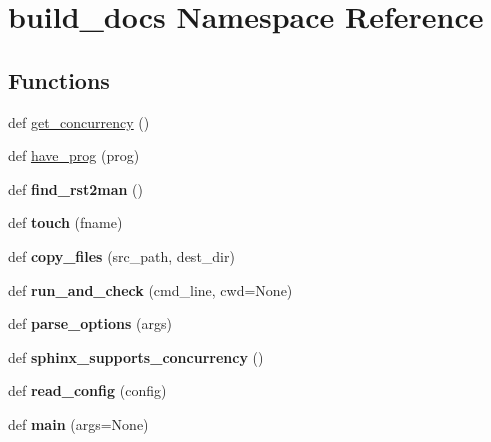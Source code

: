 \hypertarget{namespacebuild__docs}{}\section{build\+\_\+docs Namespace Reference}
\label{namespacebuild__docs}
\subsection*{Functions}
\begin{DoxyCompactItemize}
\item 
def \mbox{\hyperlink{namespacebuild__docs_adc33ba22722439845484b6f22b983e27}{get\+\_\+concurrency}} ()
\item 
def \mbox{\hyperlink{namespacebuild__docs_a9f47a32b0a2d2f838741524fd454bd83}{have\+\_\+prog}} (prog)
\item 
\mbox{\label{namespacebuild__docs_aa25e59983539da294d9d207bcf09652a}} 
def {\bfseries find\+\_\+rst2man} ()
\item 
\mbox{\label{namespacebuild__docs_a514e236726489944f91217af6b9dc1d5}} 
def {\bfseries touch} (fname)
\item 
\mbox{\label{namespacebuild__docs_ae414bc55d2fb97fbeeb17e1b8916164b}} 
def {\bfseries copy\+\_\+files} (src\+\_\+path, dest\+\_\+dir)
\item 
\mbox{\label{namespacebuild__docs_ade5dae7d70d4666c8a26b16e80ec5241}} 
def {\bfseries run\+\_\+and\+\_\+check} (cmd\+\_\+line, cwd=None)
\item 
\mbox{\label{namespacebuild__docs_a67b7b0adb0510da3126fbfa4098c4430}} 
def {\bfseries parse\+\_\+options} (args)
\item 
\mbox{\label{namespacebuild__docs_aca3cc6308adc841b7955bc1d2b65880a}} 
def {\bfseries sphinx\+\_\+supports\+\_\+concurrency} ()
\item 
\mbox{\label{namespacebuild__docs_a0a1cea446242b7824fa7b2e9667f437f}} 
def {\bfseries read\+\_\+config} (config)
\item 
\mbox{\label{namespacebuild__docs_a6feeffa9d5ec8b94f67ad2c24b2a4a4f}} 
def {\bfseries main} (args=None)
\end{DoxyCompactItemize}


